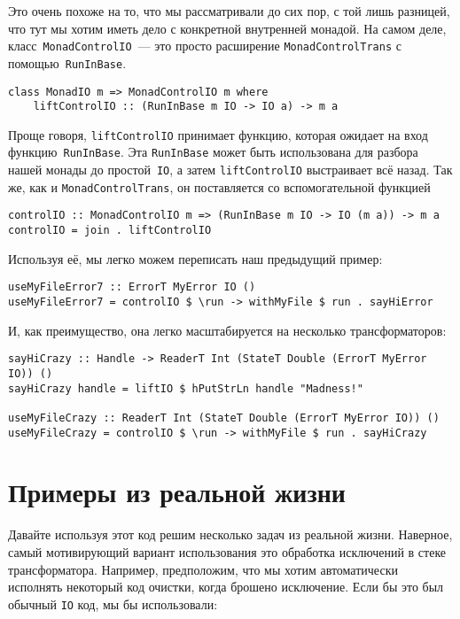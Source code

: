 Это очень похоже на то, что мы рассматривали до сих пор, с той лишь разницей,
что тут мы хотим иметь дело с конкретной внутренней монадой. На самом деле,
класс~\lstinline'MonadControlIO'~--- это просто расширение
\lstinline'MonadControlTrans' с помощью~\lstinline'RunInBase'.

\begin{lstlisting}
class MonadIO m => MonadControlIO m where
    liftControlIO :: (RunInBase m IO -> IO a) -> m a
\end{lstlisting}

Проще говоря, \lstinline'liftControlIO' принимает функцию, которая ожидает на
вход функцию~\lstinline'RunInBase'. Эта \lstinline'RunInBase' может быть
использована для разбора нашей монады до простой~\lstinline'IO', а затем
\lstinline'liftControlIO' выстраивает всё назад. Так же, как и
\lstinline'MonadControlTrans', он поставляется со вспомогательной функцией

\begin{lstlisting}
controlIO :: MonadControlIO m => (RunInBase m IO -> IO (m a)) -> m a
controlIO = join . liftControlIO
\end{lstlisting}

Используя её, мы легко можем переписать наш предыдущий пример:

\begin{lstlisting}
useMyFileError7 :: ErrorT MyError IO ()
useMyFileError7 = controlIO $ \run -> withMyFile $ run . sayHiError
\end{lstlisting}

И, как преимущество, она легко масштабируется на несколько трансформаторов:

\begin{lstlisting}
sayHiCrazy :: Handle -> ReaderT Int (StateT Double (ErrorT MyError IO)) ()
sayHiCrazy handle = liftIO $ hPutStrLn handle "Madness!"

useMyFileCrazy :: ReaderT Int (StateT Double (ErrorT MyError IO)) ()
useMyFileCrazy = controlIO $ \run -> withMyFile $ run . sayHiCrazy
\end{lstlisting}

\section{Примеры из реальной жизни}
Давайте используя этот код решим несколько задач из реальной жизни. Наверное,
самый мотивирующий вариант использования это обработка исключений в стеке
трансформатора. Например, предположим, что мы хотим автоматически исполнять
некоторый код очистки, когда брошено исключение. Если бы это был обычный \lstinline'IO'
код, мы бы использовали:

